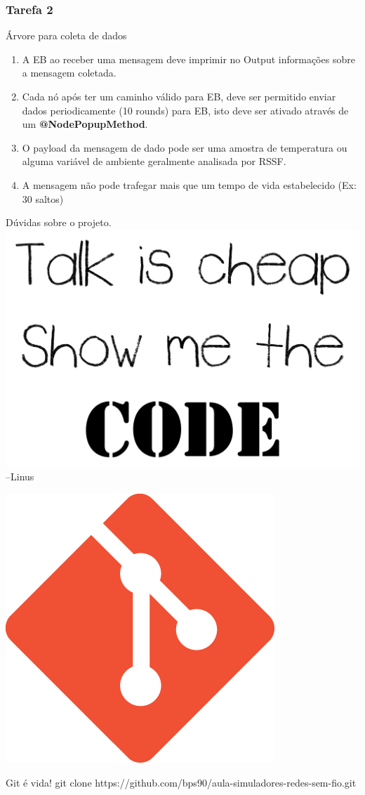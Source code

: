 \documentclass{beamer}
\begin{document}
\begin{frame}
	\frametitle{Tarefa 2}
	\begin{alertblock}{Árvore para coleta de dados}
		\begin{enumerate}

			\item A EB ao receber uma mensagem deve imprimir no Output informações sobre a mensagem coletada.

			\item Cada nó após ter um caminho válido para EB, deve ser permitido enviar dados periodicamente (10 rounds) para EB, isto deve ser ativado através de um \textbf{@NodePopupMethod}.

			\item O payload da mensagem de dado pode ser uma amostra de temperatura ou alguma variável de ambiente geralmente analisada por RSSF.

			\item A mensagem não pode trafegar mais que um tempo de vida estabelecido (Ex: 30 saltos)
		\end{enumerate}
	\end{alertblock}
\end{frame}


\begin{frame}{Dúvidas sobre o projeto.}
	\centering
	\includegraphics[width=.6\linewidth]{img/torvalds.png}
	\flushright
	--Linus
\end{frame}
\begin{frame}
\footnotesize
\centering

	\includegraphics[width=0.22\linewidth]{img/git.png}
	\begin{exampleblock}{Git é vida!}
		git clone https://github.com/bps90/aula-simuladores-redes-sem-fio.git
	\end{exampleblock}

\end{frame}
\end{document}
